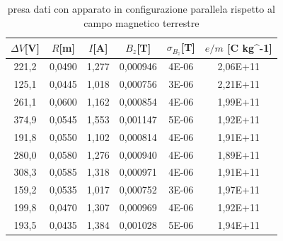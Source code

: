 \documentclass{article}
\begin{document}
   \begin{table}[H]
            \centering
            \begin{tabular}{ cccccc } 
            \toprule 
            $\Delta V$[V] & $R$[m] & $I$[A] & $B_z$[T] & $\sigma_{B_z}$[T] & $e/m$ [C kg^{-1}] \\
            \midrule 
            221,2	&	0,0490	&	1,277	&	0,000946	&	4E-06	&	2,06E+11\\
            125,1	&	0,0445	&	1,018	&	0,000756	&	3E-06	&	2,21E+11\\
            261,1	&	0,0600	&	1,162	&	0,000854	&	4E-06	&	1,99E+11\\
            374,9	&	0,0545	&	1,553	&	0,001147	&	5E-06	&	1,92E+11\\
            191,8	&	0,0550	&	1,102	&	0,000814	&	4E-06	&	1,91E+11\\
            280,0	&	0,0580	&	1,276	&	0,000940	&	4E-06	&	1,89E+11\\
            308,3	&	0,0585	&	1,318	&	0,000971	&	4E-06	&	1,91E+11\\
            159,2	&	0,0535	&	1,017	&	0,000752	&	3E-06	&	1,97E+11\\
            199,8	&	0,0470	&	1,307	&	0,000969	&	4E-06	&	1,92E+11\\
            193,5	&	0,0435	&	1,384	&	0,001028	&	5E-06	&	1,94E+11\\
            \bottomrule           
        \end{tabular}
        \caption{presa dati con apparato in configurazione parallela rispetto al campo magnetico terrestre}
        \label{misure paralleli}
    \end{table}
\end{document}
